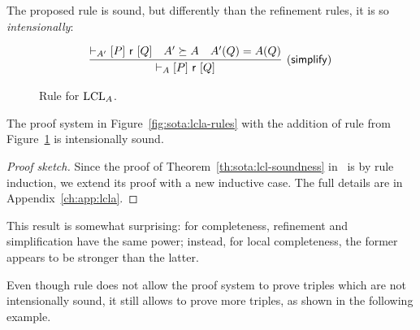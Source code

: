 The proposed rule  is sound, but differently than the refinement rules, it is so \emph{intensionally}:

\begin{figure}[t]
	\begin{framed}
		\[
		\infer[\lclrule{simplify}]
		{\lcl{A}{P}{\regr}{Q}}
		{\lcl{A'}{P}{\regr}{Q} & A' \succeq A & A'(Q) = A(Q)}
		\]
	\end{framed}
	\vspace{-1ex}
	\caption{Rule  for $\text{LCL}_A$.}\label{fig:lcla:rule-simplify}
\end{figure}

\begin{theorem}\label{th:lcla:soundness-rule-simpl}
	The proof system in Figure~\ref{fig:sota:lcla-rules} with the addition of rule  from Figure~\ref{fig:lcla:rule-simplify} is intensionally sound.
\end{theorem}
\begin{proof}[Proof sketch]
	Since the proof of Theorem~\ref{th:sota:lcl-soundness} in~\cite{BGGR21} is by rule induction, we extend its proof with a new inductive case. The full details are in Appendix~\ref{ch:app:lcla}.
\end{proof}

This result is somewhat surprising: for completeness, refinement and simplification have the same power; instead, for local completeness, the former appears to be stronger than the latter.

Even though rule  does not allow the proof system to prove triples which are not intensionally sound, it still allows to prove more triples, as shown in the following example.


